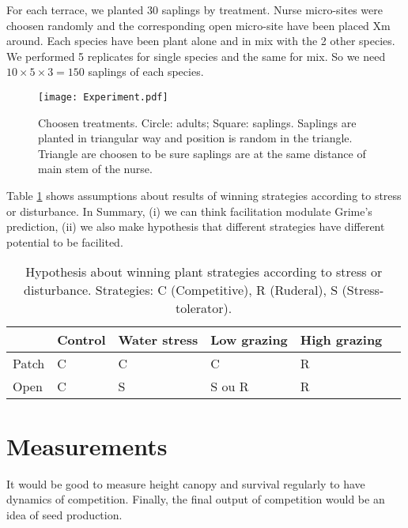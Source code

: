 \documentclass[12pt]{article} %
\begin{document}
For each terrace, we planted 30 saplings by treatment. Nurse micro-sites were choosen randomly and the corresponding open micro-site have been placed Xm around. Each species have been plant alone and in mix with the 2 other species. We performed  5 replicates for single species and the same for mix. So we need $10\times5\times3=150$ saplings of each species.


\begin{figure}
\begin{center}
\texttt{[image: Experiment.pdf]}
\end{center}
\caption{Choosen treatments. Circle: adults; Square: saplings. Saplings are planted in triangular way and position is random in the triangle. Triangle are choosen to be sure saplings are at the same distance of main stem of the nurse. \label{exp}}
\end{figure}

Table \ref{hyp} shows assumptions about results of winning strategies according to stress or disturbance. In Summary, (i) we can think facilitation modulate Grime's prediction, (ii) we also make hypothesis that different strategies have different potential to be facilited.


\begin{table}
\begin{center}
\begin{tabular}{|l|l|l|l|l|l|}
  \hline
  & Control & Water stress & Low grazing & High grazing  \\
  \hline
  Patch & C & C & C & R \\
  \hline
  Open & C & S & S ou R & R \\
  \hline
\end{tabular} 
\end{center}
\caption{Hypothesis about winning plant strategies according to stress or disturbance.  Strategies: C (Competitive), R (Ruderal), S (Stress-tolerator). \label{hyp}}
\end{table}

\section{Measurements}
It would be good to measure height canopy and survival regularly to have dynamics of competition. Finally, the final output of competition would be an idea of seed production. 
\end{document}
